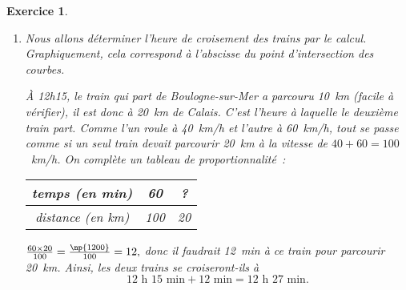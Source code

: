 \documentclass[10pt]{article}
\newtheorem{exo}{Exercice}
\begin{document}
\begin{exo}
\begin{enumerate}
\item Nous allons déterminer l'heure de croisement des trains par le calcul. Graphiquement, cela correspond à l'abscisse du point d'intersection des courbes.

\medskip

\`A 12h15, le train qui part de Boulogne-sur-Mer a parcouru 10~km (facile à vérifier), il est donc à 20~km de Calais. C'est l'heure à laquelle le deuxième train part. Comme l'un roule à 40~km/h et l'autre à 60~km/h, tout se passe comme si un seul train devait parcourir 20~km à la vitesse de $40+60=100$~km/h. On complète un tableau de proportionnalité~:

\begin{center}
\begin{tabular}{|c|c|c|}\hline
temps (en min)& 60&? \\ \hline 
distance (en km)&100& 20 \\ \hline
\end{tabular}
\end{center}

$\frac{60\times 20}{100}=\frac{\np{1200}}{100}=12,$ donc il faudrait 12~min à ce train pour parcourir 20~km. Ainsi, les deux trains se croiseront-ils à \[\text{12 h 15 min}+\text{12 min}=\text{12 h 27 min}.\]
 
\end{enumerate}

\end{exo}
\end{document}
